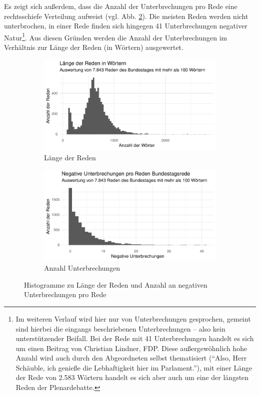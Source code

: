 \documentclass[12pt, 
    twoside=false, 
    bibliography=totoc, 
    numbers=endperiod, 
    headings=normal, 
    toc=chapterentrydotfill
    ]{scrbook}
\begin{document}
Es zeigt sich außerdem, dass die Anzahl der Unterbrechungen pro Rede eine rechtsschiefe Verteilung aufweist (vgl. Abb. \ref{fig:histo_unterbrechung}). Die meisten Reden werden nicht unterbrochen, in einer Rede finden sich hingegen 41 Unterbrechungen negativer Natur\footnote{Im weiteren Verlauf wird hier nur von Unterbrechungen gesprochen, gemeint sind hierbei die eingangs beschriebenen Unterbrechungen -- also kein unterstützender Beifall. Bei der Rede mit 41 Unterbrechungen handelt es sich um einen Beitrag von Christian Lindner, FDP. Diese außergewöhnlich hohe Anzahl wird auch durch den Abgeordneten selbst thematisiert (\enquote{Also, Herr Schäuble, ich genieße die Lebhaftigkeit hier im Parlament.}), mit einer Länge der Rede von 2.583 Wörtern handelt es sich aber auch um eine der längsten Reden der Plenardebatte.}. Aus diesen Gründen werden die Anzahl der Unterbrechungen im Verhältnis zur Länge der Reden (in Wörtern) ausgewertet.


\begin{figure}[H]
    \centering
    \begin{subfigure}{.5\textwidth}
      \centering
      \includegraphics[width=.9\linewidth]{images/histo_laenge_rede.pdf}
      \caption{Länge der Reden}
      \label{fig:histo_laenge}
    \end{subfigure}%
    \begin{subfigure}{.5\textwidth}
      \centering
      \includegraphics[width=.9\linewidth]{images/histo_anzahl_unterbrechung.pdf}
      \caption{Anzahl Unterbrechungen}
      \label{fig:histo_unterbrechung}
    \end{subfigure}
    \caption[Histogramme zu Länge der Reden und Anzahl an negativen Unterbrechungen pro Rede]{Histogramme zu Länge der Reden und Anzahl an negativen Unterbrechungen pro Rede}
    \label{fig:histogramme}
\end{figure}
\end{document}
